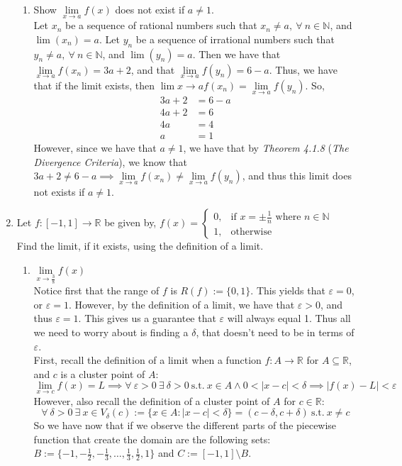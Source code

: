 \documentclass[12pt,letterpaper]{article}
\newcommand{\st}{\ \text{s.t.}\ }
\newcommand{\R}{\mathbb{R}}
\newcommand{\N}{\mathbb{N}}
\theoremstyle{case}
\theoremstyle{definition}
\begin{document}
\begin{enumerate}
\begin{enumerate}
			\item Show $\lim\limits_{x \to a} f(x)$ does not exist if $a \neq 1$.\\
			
			Let $x_n$ be a sequence of rational numbers such that $x_n \neq a,\ \forall\ n \in \N$, and $\lim (x_n) =a$. Let $y_n$ be a sequence of irrational numbers such that $y_n \neq a,\ \forall\ n \in \N$, and $\lim (y_n)=a$. Then we have that $\lim\limits_{x \to a} f(x_n) = 3a+2$, and that $\lim\limits_{x \to a} f(y_n) = 6-a$. Thus, we have that if the limit exists, then $\lim\limits{x \to a} f(x_n) = \lim\limits_{x \to a} f(y_n)$. So,
			\begin{align*}
				3a+2 &= 6-a \\
				4a+2 &= 6 \\
				4a &= 4 \\
				a &= 1
			\end{align*}
			However, since we have that $a \neq 1$, we have that by \textit{Theorem 4.1.8} (\textit{The Divergence Criteria}), we know that $3a+2 \neq 6-a \implies \lim\limits_{x \to a} f(x_n) \neq \lim\limits_{x \to a} f(y_n)$, and thus this limit does not exists if $a \neq 1$.
		\end{enumerate}

	\item Let $f:[-1,1] \to \R$ be given by, $f(x)=\begin{cases}
	0, & \text{if } x=\pm\frac{1}{n} \text{ where } n \in \N \\
	1, & \text{otherwise}
	\end{cases}$\\
	Find the limit, if it exists, using the definition of a limit.
		\begin{enumerate}
			\item $\lim\limits_{x \to \frac{3}{8}} f(x)$\\
			
			Notice first that the range of $f$ is $R(f):= \{0,1\}$. This yields that $\varepsilon = 0$, or $\varepsilon=1$. However, by the definition of a limit, we have that $\varepsilon>0$, and thus $\varepsilon=1$. This gives us a guarantee that $\varepsilon$ will always equal 1. Thus all we need to worry about is finding a $\delta$, that doesn't need to be in terms of $\varepsilon$.\\
			
			First, recall the definition of a limit when a function $f:A \to \R$ for $A \subseteq \R$, and $c$ is a cluster point of $A$:
			\[\lim\limits_{x \to c} f(x)=L \implies \forall\ \varepsilon>0\ \exists\ \delta >0 \st x \in A \wedge 0<|x-c|<\delta \implies |f(x)-L|<\varepsilon\]
			However, also recall the definition of a cluster point of $A$ for $c \in \R$:
			\[\forall\ \delta > 0\ \exists\ x \in V_\delta (c):=\{x \in A:|x-c|<\delta\}=(c-\delta, c+\delta) \st x \neq c\]
			So we have now that if we observe the different parts of the piecewise function that create the domain are the following sets: $B:=\{-1, -\frac{1}{2}, -\frac{1}{3}, \dots, \frac{1}{3}, \frac{1}{2}, 1\}$ and $C:= [-1,1] \setminus B$.\\
			

\end{enumerate}
\end{enumerate}
\end{document}
